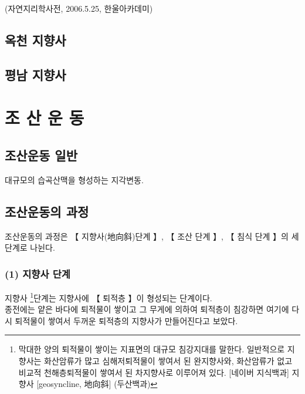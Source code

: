 \documentclass[12pt,a4paper]{book}
\newcommand{\SectionMargin}			{\newpage  \null \vskip 0cm}
\newcommand{\SubSectionMargin}		{\newpage  \null \vskip 0cm}
\begin{document}
		(자연지리학사전, 2006.5.25, 한울아카데미)


	\SectionMargin
	\section{옥천 지향사}








	\SectionMargin
	\section{평남 지향사}




\newpage
\chapter{조 산 운 동}




	\SectionMargin
	\section{	조산운동 일반}

		대규모의 습곡산맥을 형성하는 지각변동.



	\SectionMargin
	\section{	조산운동의 과정}

		조산운동의 과정은 【 지향사(地向斜)단계 】, 【 조산 단계 】, 【 침식 단계 】의 세 단계로 나뉜다. 

	\SubSectionMargin
	\subsection{(1) 지향사 단계}

		지향사 \footnote{막대한 양의 퇴적물이 쌓이는 지표면의 대규모 침강지대를 말한다. 
		일반적으로 지향사는 화산암류가 많고 심해저퇴적물이 쌓여서 된 완지향사와, 
		화산암류가 없고 비교적 천해층퇴적물이 쌓여서 된 차지향사로 이루어져 있다.
		[네이버 지식백과] 지향사 [geosyncline, 地向斜] (두산백과)}단계는 
		지향사에 【 퇴적층 】이 형성되는 단계이다. 
		\\[-1.0em]

		종전에는 얕은 바다에 퇴적물이 쌓이고 그 무게에 의하여 퇴적층이 침강하면 
		여기에 다시 퇴적물이 쌓여서 두꺼운 퇴적층의 지향사가 만들어진다고 보았다. 
		\\[-1.0em]
\end{document}
